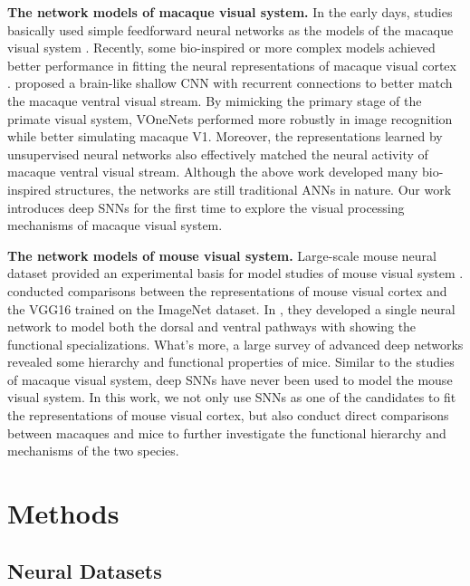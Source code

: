 \documentclass[letterpaper]{article} %
\begin{document}
\textbf{The network models of macaque visual system.} In the early days, studies basically used simple feedforward neural networks as the models of the macaque visual system \cite{khaligh2014deep, yamins2014performance, yamins2016using}. Recently, some bio-inspired or more complex models achieved better performance in fitting the neural representations of macaque visual cortex \cite{kubilius2019brain, dapello2020simulating, zhuang2021unsupervised, higgins2021unsupervised}. \cite{kubilius2019brain} proposed a brain-like shallow CNN with recurrent connections to better match the macaque ventral visual stream. By mimicking the primary stage of the primate visual system, VOneNets \cite{dapello2020simulating} performed more robustly in image recognition while better simulating macaque V1. Moreover, the representations learned by unsupervised neural networks \cite{zhuang2021unsupervised, higgins2021unsupervised} also effectively matched the neural activity of macaque ventral visual stream. Although the above work developed many bio-inspired structures, the networks are still traditional ANNs in nature. Our work introduces deep SNNs for the first time to explore the visual processing mechanisms of macaque visual system.

\textbf{The network models of mouse visual system.} Large-scale mouse neural dataset provided an experimental basis for model studies of mouse visual system \cite{de2020large, siegle2021survey}. \cite{shi2019comparison} conducted comparisons between the representations of mouse visual cortex and the VGG16 trained on the ImageNet dataset. In \cite{bakhtiari2021functional}, they developed a single neural network to model both the dorsal and ventral pathways with showing the functional specializations. What's more, a large survey of advanced deep networks \cite{conwell2021neural} revealed some hierarchy and functional properties of mice. Similar to the studies of macaque visual system, deep SNNs have never been used to model the mouse visual system. In this work, we not only use SNNs as one of the candidates to fit the representations of mouse visual cortex, but also conduct direct comparisons between macaques and mice to further investigate the functional hierarchy and mechanisms of the two species.

\section{Methods}
\label{methods}

\subsection{Neural Datasets}
\label{methods.dataset}
\end{document}
